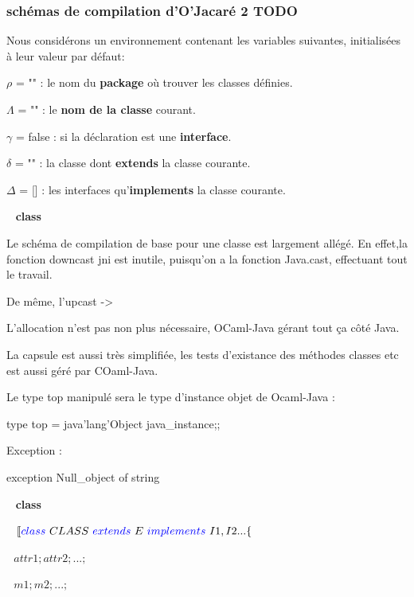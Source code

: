 \documentclass[a4paper, 11pt]{article}
\begin{document}
\subsubsection{schémas de compilation d'O'Jacaré 2 TODO}

\noindent
Nous considérons un environnement contenant les  variables suivantes, initialisées à leur valeur par défaut: 

$\rho$ = "" : le nom du \textbf{package} où trouver les classes définies.

$\Lambda$ = "" : le \textbf{nom de la classe} courant.

$\gamma$ = false : si la déclaration est une \textbf{interface}.

$\delta$ = "" : la classe dont \textbf{extends} la classe courante.

$\Delta$ = [] : les interfaces qu'\textbf{implements} la classe courante.
\ %


\ 
\newline
\textbf{class}

Le schéma de compilation de base pour une classe est largement allégé. 
En effet,la fonction downcast jni est inutile, puisqu'on a la fonction Java.cast, effectuant tout le travail.

De même, l'upcast -> 


L'allocation n'est pas non plus nécessaire, OCaml-Java gérant tout ça côté Java. 

La capsule est aussi très simplifiée, les tests d'existance des méthodes classes etc est aussi géré par COaml-Java.


Le type top manipulé sera le type d'instance objet de Ocaml-Java :
\begin{OCamlEx}
type top = java'lang'Object java_instance;;
\end{OCamlEx}

Exception :
\begin{OCamlEx}
exception Null_object of string
\end{OCamlEx}


\ 
\newline
\textbf{class}

\ 
\newline
\noindent
$[\![ {\color{blue}class}\ CLASS\ 
 {\color{blue}extends}\  E \ 
 {\color{blue}implements}\  I1,I2... \{$

 $ \ \ \ attr1; attr2; ...;$

  $\ \ \ m1; m2; ...;$
\end{document}
